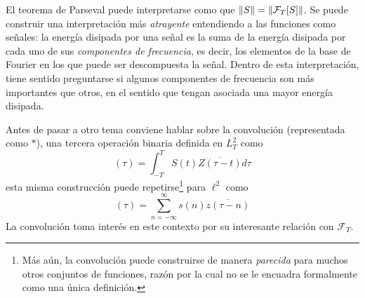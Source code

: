 El teorema de Parseval puede interpretarse como que $\left\Vert S \right\Vert = \left\Vert \mathcal{F}_T[S] \right\Vert$.
%
Se puede construir una interpretación más \textit{atrayente} entendiendo a las funciones como señales:
la energía disipada por una señal es la suma de la energía disipada por cada uno de sus \textit{componentes de frecuencia}, es decir, los elementos de la base de Fourier en los que puede ser descompuesta la señal.
%
%
Dentro de esta interpretación, tiene sentido preguntarse si algunos componentes de frecuencia son más importantes que otros, en el sentido que tengan asociada una mayor energía disipada.


Antes de pasar a otro tema conviene hablar sobre la convolución (representada como $\ast$), una tercera operación binaria definida en $L^{2}_T$ como
\begin{equation}
[S \ast Z] (\tau) = \int_{-T}^{T} S(t) \overline{Z(\tau-t)} d\tau
\end{equation}
esta misma construcción puede repetirse\footnote{Más aún, la convolución puede construirse de manera \textit{parecida} para muchos otros conjuntos de funciones, razón por la cual no se le encuadra formalmente como una única definición.} para $\ell^{2}$ como
\begin{equation}
[s \ast z] (\tau) = \sum_{n=-\infty}^{\infty} s(n) \overline{z(\tau-n)}
\end{equation}
La convolución toma interés en este contexto por su interesante relación con $\mathcal{F}_T$.

